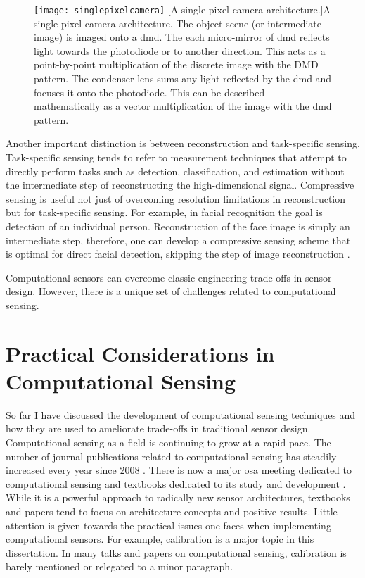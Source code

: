 \begin{figure}
    \texttt{[image: singlepixelcamera]}
    [A single pixel camera architecture.]{A single pixel camera architecture. The object scene (or intermediate image) is imaged onto a \acrfull{dmd}. The each micro-mirror of \gls{dmd} reflects light towards the photodiode or to another direction. This acts as a point-by-point multiplication of the discrete image with the DMD pattern. The condenser lens sums any light reflected by the \gls{dmd} and focuses it onto the photodiode. This can be described mathematically as a vector multiplication of the image with the \gls{dmd} pattern. }
    \label{fig:singlepixelcamera}
\end{figure}

Another important distinction is between reconstruction and task-specific sensing. Task-specific sensing tends to refer to measurement techniques that attempt to directly perform tasks such as detection, classification, and estimation without the intermediate step of reconstructing the high-dimensional signal. Compressive sensing is useful not just of overcoming resolution limitations in reconstruction but for task-specific sensing. For example, in facial recognition the goal is detection of an individual person. Reconstruction of the face image is simply an intermediate step, therefore, one can develop a compressive sensing scheme that is optimal for direct facial detection, skipping the step of image reconstruction \cite{pal2005face}. 

Computational sensors can overcome classic engineering trade-offs in sensor design. However, there is a unique set of challenges related to computational sensing.

\section{Practical Considerations in Computational Sensing}

So far I have discussed the development of computational sensing techniques and how they are used to ameliorate trade-offs in traditional sensor design. Computational sensing as a field is continuing to grow at a rapid pace. The number of journal publications related to computational sensing has steadily increased every year since 2008 \cite{stern2016hurdles}. There is now a major \gls{osa} meeting dedicated to computational sensing \cite{cosi2016meetingwebsite} and textbooks dedicated to its study and development \cite{brady2009optical, foucart2013mathematical}. While it is a powerful approach to radically new sensor architectures, textbooks and papers tend to focus on architecture concepts and positive results. Little attention is given towards the practical issues one faces when implementing computational sensors. For example, calibration is a major topic in this dissertation. In many talks and papers on computational sensing, calibration is barely mentioned or relegated to a minor paragraph. 

